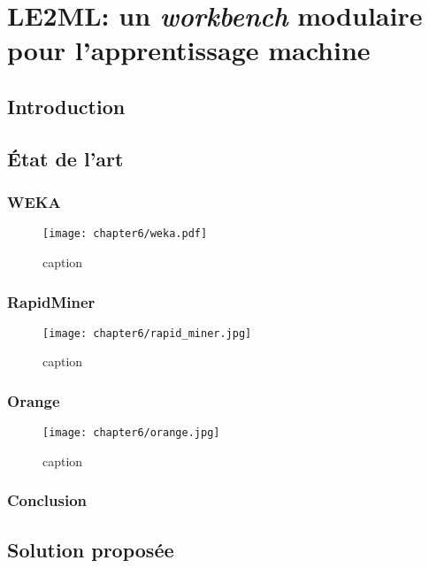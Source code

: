\chapter{LE2ML: un \textit{workbench} modulaire pour l'apprentissage machine}
\label{chap:6}

\section{Introduction}

\section{État de l'art}

\subsection{WEKA}

\begin{figure}[H]
	\centering
	\texttt{[image: chapter6/weka.pdf]}
        \caption{caption}
	\label{fig:weka}
\end{figure}

\subsection{RapidMiner}

\begin{figure}[H]
	\centering
	\texttt{[image: chapter6/rapid\_miner.jpg]}
        \caption{caption}
	\label{fig:rapid_miner}
\end{figure}

\subsection{Orange}

\begin{figure}[H]
	\centering
	\texttt{[image: chapter6/orange.jpg]}
        \caption{caption}
	\label{fig:orange}
\end{figure}

\subsection{Conclusion}

\section{Solution proposée}

